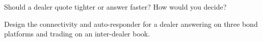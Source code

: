 \begin{interviewq}\label{iq:nw:fixed-income-and-rfq-platform-connectivity:5}
Should a dealer quote tighter or answer faster? How would you decide?
\end{interviewq}

\begin{interviewq}\label{iq:nw:fixed-income-and-rfq-platform-connectivity:6}
Design the connectivity and auto-responder for a dealer answering on three bond platforms and trading on an inter-dealer book.
\end{interviewq}
